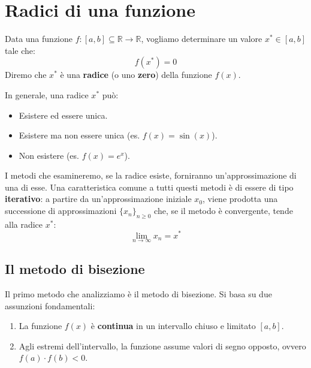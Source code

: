 \section{Radici di una funzione}

Data una funzione $f: [a,b] \subseteq \mathbb{R} \to \mathbb{R}$, vogliamo determinare un valore $x^* \in [a,b]$ tale che:
\[
f(x^*) = 0
\]
Diremo che $x^*$ è una \textbf{radice} (o uno \textbf{zero}) della funzione $f(x)$.

In generale, una radice $x^*$ può:
\begin{itemize}
    \item Esistere ed essere unica.
    \item Esistere ma non essere unica (es. $f(x) = \sin(x)$).
    \item Non esistere (es. $f(x) = e^x$).
\end{itemize}

I metodi che esamineremo, se la radice esiste, forniranno un'approssimazione di una di esse.  
Una caratteristica comune a tutti questi metodi è di essere di tipo \textbf{iterativo}:  
a partire da un'approssimazione iniziale $x_0$, viene prodotta una successione di approssimazioni $\{x_n\}_{n \ge 0}$ che, se il metodo è convergente, tende alla radice $x^*$:
\[
\lim_{n \to \infty} x_n = x^*
\]

\subsection{Il metodo di bisezione}
Il primo metodo che analizziamo è il metodo di bisezione.  
Si basa su due assunzioni fondamentali:
\begin{enumerate}
    \item La funzione $f(x)$ è \textbf{continua} in un intervallo chiuso e limitato $[a,b]$.
    \item Agli estremi dell'intervallo, la funzione assume valori di segno opposto, ovvero $f(a) \cdot f(b) < 0$.
\end{enumerate}

